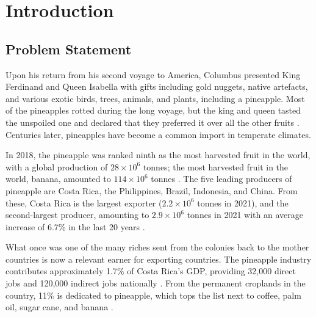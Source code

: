 \chapter{Introduction}






\section{Problem Statement}

Upon his return from his second voyage to America, Columbus presented King Ferdinand and Queen Isabella with gifts including gold nuggets, native artefacts, and various exotic birds, trees, animals, and plants, including a pineapple. Most of the pineapples rotted during the long voyage, but the king and queen tasted the unspoiled one and declared that they preferred it over all the other fruits \citep{o2013pineapple}. Centuries later, pineapples have become a common import in temperate climates. 

In 2018, the pineapple was ranked ninth as the most harvested fruit in the world, with a global production of $28 \times 10^6$ tonnes; the most harvested fruit in the world, banana, amounted to $114 \times 10^6$ tonnes \citep{fruit2020international}. The five leading producers of pineapple are Costa Rica, the Philippines, Brazil, Indonesia, and China. From these, Costa Rica is the largest exporter ($2.2 \times 10^6$ tonnes in 2021), and the second-largest producer, amounting to $2.9 \times 10^6$ tonnes in 2021 with an average increase of 6.7\% in the last 20 years \citep{FAOSTAT2022}. 

What once was one of the many riches sent from the colonies back to the mother countries is now a relevant earner for exporting countries. The pineapple industry contributes approximately 1.7\% of Costa Rica's GDP, providing 32,000 direct jobs and 120,000 indirect jobs nationally \citep{chen2020production, employmentCR}. From the permanent croplands in the country, 11\% is dedicated to pineapple, which tops the list next to coffee, palm oil, sugar cane, and banana \citep{cenagro2014}. 

